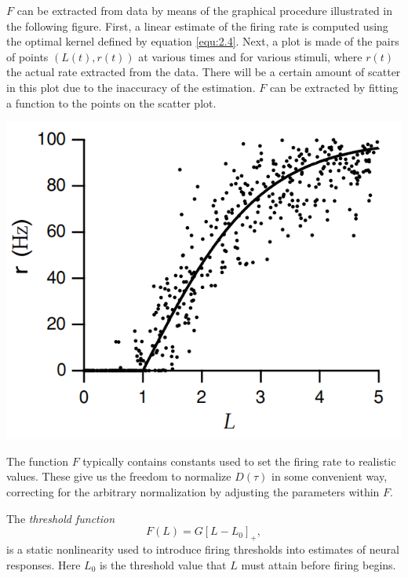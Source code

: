 \begin{exm}
  $F$ can be extracted from data by means of the graphical procedure illustrated in the following figure. First, a linear estimate of the firing rate is computed using the optimal kernel defined by equation \ref{equ:2.4}. Next, a plot is made of the pairs of points $(L(t),r(t))$ at various times and for various stimuli, where $r(t)$ the actual rate extracted from the data. There will be a certain amount of scatter in this plot due to the inaccuracy of the estimation. $F$ can be extracted by fitting a function to the points on the scatter plot.
  \begin{center}
    \includegraphics[scale=0.3]{./png/staticNonlinearity}
  \end{center}
\end{exm}

\begin{rem}
  The function $F$ typically contains constants used to set the firing rate to realistic values. These give us the freedom to normalize $D(\tau)$ in some convenient way, correcting for the arbitrary normalization by adjusting the parameters within $F$.
\end{rem}

\begin{exm}
  \label{thresholdFunction}
  The \emph{threshold function}
  \begin{equation}
    \label{equ:2.9}
    F(L) = G[L-L_0]_+,
  \end{equation}
  is a static nonlinearity used to introduce firing thresholds into estimates of neural responses. Here $L_0$ is the threshold value that $L$ must attain before firing begins.
\end{exm}

